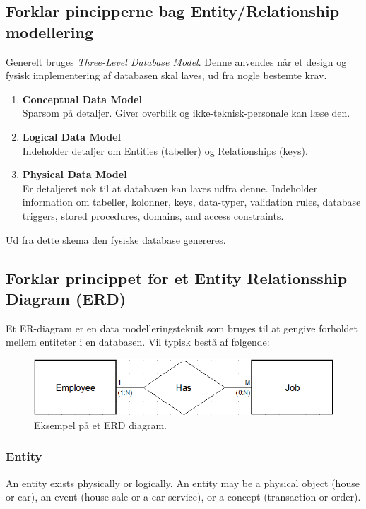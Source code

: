 \newpage

\subsection{Forklar pincipperne bag Entity/Relationship modellering}

Generelt bruges \textit{Three-Level Database Model}. Denne anvendes når et design og fysisk implementering af databasen skal laves, ud fra nogle bestemte krav. 

\begin{enumerate}
	\item \textbf{Conceptual Data Model}\\
	Sparsom på detaljer. Giver overblik og ikke-teknisk-personale kan læse den.
	\item \textbf{Logical Data Model}\\
	Indeholder detaljer om Entities (tabeller) og Relationships (keys).
	\item \textbf{Physical Data Model}\\
	Er detaljeret nok til at databasen kan laves udfra denne. Indeholder information om tabeller, kolonner, keys, data-typer, validation rules, database triggers, stored procedures, domains, and access constraints.
\end{enumerate}

Ud fra dette skema den fysiske database genereres.

\subsection{Forklar princippet for et Entity Relationsship Diagram (ERD)}

Et ER-diagram er en data modelleringsteknik som bruges til at gengive forholdet mellem entiteter i en databasen. Vil typisk bestå af følgende:

\begin{figure}[h]
	\centering
	\includegraphics[width=0.8\linewidth]{figs/spm1/entity_in_relation}
	\caption{Eksempel på et ERD diagram.}
	\label{fig:erd}
\end{figure}

\subsubsection{Entity}
An entity exists physically or logically. An entity may be a physical object (house or car), an event (house sale or a car service), or a concept (transaction or order).

